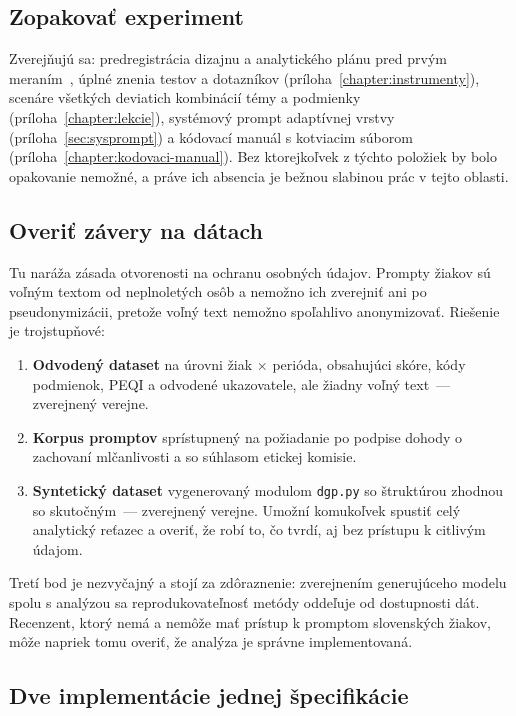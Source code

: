 \subsection{Zopakovať experiment}

Zverejňujú sa: predregistrácia dizajnu a analytického plánu pred prvým meraním~\cite{nosek2018preregistration}, úplné znenia testov a dotazníkov (príloha~\ref{chapter:instrumenty}), scenáre všetkých deviatich kombinácií témy a podmienky (príloha~\ref{chapter:lekcie}), systémový prompt adaptívnej vrstvy (príloha~\ref{sec:sysprompt}) a kódovací manuál s kotviacim súborom (príloha~\ref{chapter:kodovaci-manual}). Bez ktorejkoľvek z týchto položiek by bolo opakovanie nemožné, a práve ich absencia je bežnou slabinou prác v tejto oblasti.

\subsection{Overiť závery na dátach}

Tu naráža zásada otvorenosti na ochranu osobných údajov. Prompty žiakov sú voľným textom od neplnoletých osôb a nemožno ich zverejniť ani po pseudonymizácii, pretože voľný text nemožno spoľahlivo anonymizovať. Riešenie je trojstupňové:

\begin{enumerate}[nosep]
    \item \textbf{Odvodený dataset} na úrovni žiak $\times$ perióda, obsahujúci skóre, kódy podmienok, PEQI a odvodené ukazovatele, ale žiadny voľný text~--- zverejnený verejne.
    \item \textbf{Korpus promptov} sprístupnený na požiadanie po podpise dohody o zachovaní mlčanlivosti a so súhlasom etickej komisie.
    \item \textbf{Syntetický dataset} vygenerovaný modulom \texttt{dgp.py} so štruktúrou zhodnou so skutočným~--- zverejnený verejne. Umožní komukoľvek spustiť celý analytický reťazec a overiť, že robí to, čo tvrdí, aj bez prístupu k citlivým údajom.
\end{enumerate}

Tretí bod je nezvyčajný a stojí za zdôraznenie: zverejnením generujúceho modelu spolu s analýzou sa reprodukovateľnosť metódy oddeľuje od dostupnosti dát. Recenzent, ktorý nemá a nemôže mať prístup k promptom slovenských žiakov, môže napriek tomu overiť, že analýza je správne implementovaná.

\subsection{Dve implementácie jednej špecifikácie}
\label{sec:dve-implementacie}

